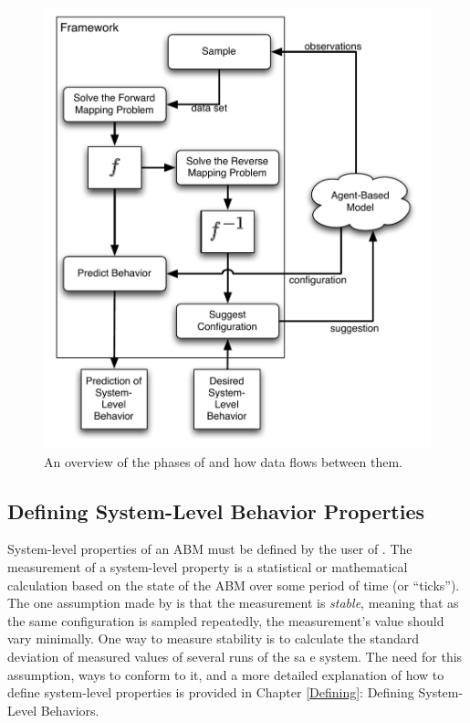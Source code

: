 \begin{figure}[H]
\centering
\includegraphics[scale=1]{images/framework.pdf}
\caption{An overview of the phases of \fw and how data flows between them.}
\label{fig:frameworkdiag}
\end{figure}

\subsection{Defining System-Level Behavior Properties}
System-level properties of an ABM must be defined by the user of \fw.
The measurement of a system-level property is a statistical or mathematical calculation based on the state of the ABM over some period of time (or ``ticks'').
The one assumption made by \fw is that the measurement is \textit{stable}, meaning that as the same configuration is sampled repeatedly, the measurement's value should vary minimally.
One way to measure stability is to calculate the standard deviation of measured values of several runs of the sa e system.
The need for this assumption, ways to conform to it, and a more detailed explanation of how to define system-level properties is provided in Chapter \ref{Defining}: Defining System-Level Behaviors.

